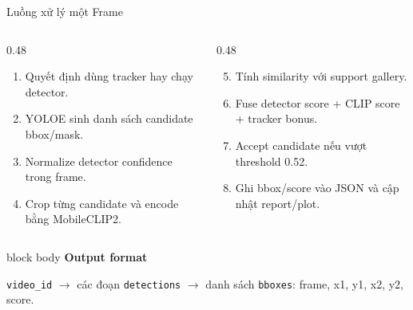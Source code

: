 \documentclass[aspectratio=169]{beamer}
\newcommand{\tightitem}{\setlength\itemsep{0.42em}}
\newenvironment{bluebox}[1]{
  \begin{beamercolorbox}[rounded=true,shadow=false,wd=\linewidth,sep=0.28cm]{block body}
  {\bfseries\color{DeepBlue}#1}\par\vspace{0.12cm}
}{
  \end{beamercolorbox}
}
\begin{document}
\begin{frame}{Luồng xử lý một Frame}
  \small
  \begin{columns}[T,onlytextwidth]
    \begin{column}{0.48\textwidth}
      \begin{enumerate}
        \tightitem
        \item Quyết định dùng tracker hay chạy detector.
        \item YOLOE sinh danh sách candidate bbox/mask.
        \item Normalize detector confidence trong frame.
        \item Crop từng candidate và encode bằng MobileCLIP2.
      \end{enumerate}
    \end{column}
    \begin{column}{0.48\textwidth}
      \begin{enumerate}
        \setcounter{enumi}{4}
        \tightitem
        \item Tính similarity với support gallery.
        \item Fuse detector score + CLIP score + tracker bonus.
        \item Accept candidate nếu vượt threshold 0.52.
        \item Ghi bbox/score vào JSON và cập nhật report/plot.
      \end{enumerate}
    \end{column}
  \end{columns}
  \vspace{0.35cm}
  \begin{bluebox}{Output format}
    \scriptsize
    \texttt{video\_id} \(\rightarrow\) các đoạn \texttt{detections} \(\rightarrow\) danh sách \texttt{bboxes}: frame, x1, y1, x2, y2, score.
  \end{bluebox}
\end{frame}
\end{document}
